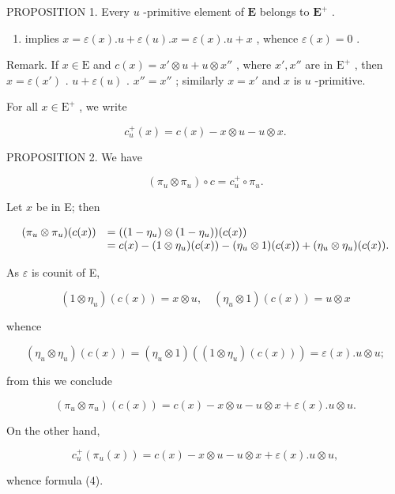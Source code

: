 PROPOSITION 1. Every \(u\) -primitive element of \(\mathbf{E}\) belongs to \(\mathbf{E}^{+}\) .

\begin{enumerate}
\def\labelenumi{(\arabic{enumi})}
\setcounter{enumi}{1}
\tightlist
\item
  implies \(x = \varepsilon(x).u + \varepsilon(u).x = \varepsilon(x).u + x\) , whence \(\varepsilon(x) = 0\) .
\end{enumerate}

Remark. If \(x \in \mathrm{E}\) and \(c(x) = x' \otimes u + u \otimes x''\) , where \(x', x''\) are in \(\mathrm{E}^+\) , then \(x = \varepsilon(x')\) . \(u + \varepsilon(u)\) . \(x'' = x''\) ; similarly \(x = x'\) and \(x\) is \(u\) -primitive.

For all \(x \in \mathrm{E}^{+}\) , we write

\[
c _ {u} ^ {+} (x) = c (x) - x \otimes u - u \otimes x.\tag{3}
\]

PROPOSITION 2. We have

\[
\left(\pi_ {u} \otimes \pi_ {u}\right) \circ c = c _ {u} ^ {+} \circ \pi_ {u}.\tag{4}
\]

Let \(x\) be in E; then

\[
\begin{array}{r l} (\pi_ {u} \otimes \pi_ {u}) (c (x)) & = ((1 - \eta_ {u}) \otimes (1 - \eta_ {u})) (c (x)) \\ & = c (x) - (1 \otimes \eta_ {u}) (c (x)) - (\eta_ {u} \otimes 1) (c (x)) + (\eta_ {u} \otimes \eta_ {u}) (c (x)). \end{array}
\]

As \(\varepsilon\) is counit of E,

\[
(1 \otimes \eta_ {u}) (c (x)) = x \otimes u, \quad (\eta_ {u} \otimes 1) (c (x)) = u \otimes x
\]

whence

\[
\left(\eta_ {u} \otimes \eta_ {u}\right) (c (x)) = \left(\eta_ {u} \otimes 1\right) \left(\left(1 \otimes \eta_ {u}\right) (c (x))\right) = \varepsilon (x). u \otimes u;
\]

from this we conclude

\[
\left(\pi_ {u} \otimes \pi_ {u}\right) (c (x)) = c (x) - x \otimes u - u \otimes x + \varepsilon (x). u \otimes u.
\]

On the other hand,

\[
c _ {u} ^ {+} \left(\pi_ {u} (x)\right) = c (x) - x \otimes u - u \otimes x + \varepsilon (x). u \otimes u,
\]

whence formula (4).

